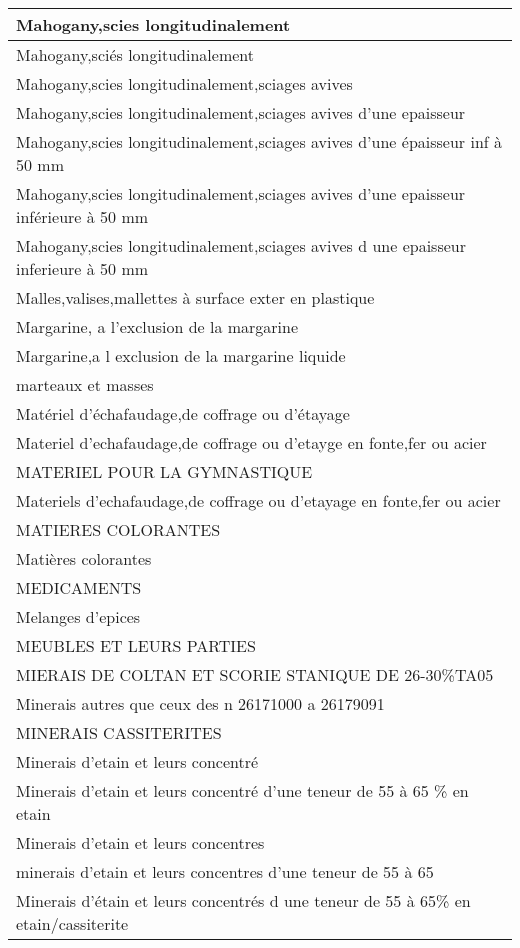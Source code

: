 \documentclass[
]{book}
\begin{document}
\begin{table}
\begin{tabular}[t]{l}
Mahogany,scies longitudinalement\\
\hline
Mahogany,sciés longitudinalement\\
\hline
Mahogany,scies longitudinalement,sciages avives\\
\hline
Mahogany,scies longitudinalement,sciages avives d'une epaisseur\\
\hline
Mahogany,scies longitudinalement,sciages avives d'une épaisseur inf à 50 mm\\
\hline
Mahogany,scies longitudinalement,sciages avives d'une epaisseur inférieure à 50 mm\\
\hline
Mahogany,scies longitudinalement,sciages avives d une epaisseur inferieure à 50 mm\\
\hline
Malles,valises,mallettes à surface exter en plastique\\
\hline
Margarine, a l'exclusion de la margarine\\
\hline
Margarine,a l exclusion de la margarine liquide\\
\hline
marteaux et masses\\
\hline
Matériel d'échafaudage,de coffrage ou d'étayage\\
\hline
Materiel d'echafaudage,de coffrage ou d'etayge en fonte,fer ou acier\\
\hline
MATERIEL POUR LA GYMNASTIQUE\\
\hline
Materiels d'echafaudage,de coffrage ou d'etayage en fonte,fer ou acier\\
\hline
MATIERES COLORANTES\\
\hline
Matières colorantes\\
\hline
MEDICAMENTS\\
\hline
Melanges d'epices\\
\hline
MEUBLES ET LEURS PARTIES\\
\hline
MIERAIS DE COLTAN    ET SCORIE STANIQUE DE 26-30\%TA05\\
\hline
Minerais autres que ceux des n 26171000 a 26179091\\
\hline
MINERAIS CASSITERITES\\
\hline
Minerais d'etain et leurs concentré\\
\hline
Minerais d'etain et leurs concentré d'une teneur de 55 à 65 \% en etain\\
\hline
Minerais d'etain et leurs concentres\\
\hline
minerais d'etain et leurs concentres d'une teneur de 55 à 65\\
\hline
Minerais d'étain et leurs concentrés d une teneur de 55 à 65\% en etain/cassiterite\\

\end{tabular}
\end{table}
\end{document}
